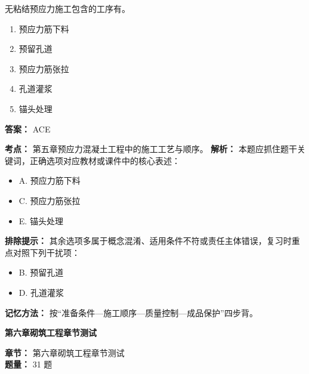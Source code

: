 \documentclass[UTF8,fontset=fandol,11pt]{ctexart}
\newcommand{\chaptertitle}[1]{\vspace{0.5em}\begin{tcolorbox}[enhanced,colback=deepblue,colframe=deepblue,arc=2mm,boxrule=0pt]\begin{center}\Large\bfseries\color{white}#1\end{center}\end{tcolorbox}\vspace{0.5em}}
\begin{document}
\begin{quizbox}[title={第 7 题}]
无粘结预应力施工包含的工序有。\\
\begin{enumerate}[label=\Alph*.]
\item 预应力筋下料
\item 预留孔道
\item 预应力筋张拉
\item 孔道灌浆
\item 锚头处理
\end{enumerate}
\textbf{答案：} ACE
\vspace{0.25em}
\begin{answerbox}[title={考点解析}]
\textbf{考点：} 第五章预应力混凝土工程中的施工工艺与顺序。
\textbf{解析：} 本题应抓住题干关键词，正确选项对应教材或课件中的核心表述：
\begin{itemize}
\item A. 预应力筋下料
\item C. 预应力筋张拉
\item E. 锚头处理
\end{itemize}
\textbf{排除提示：} 其余选项多属于概念混淆、适用条件不符或责任主体错误，复习时重点对照下列干扰项：
\begin{itemize}
\item B. 预留孔道
\item D. 孔道灌浆
\end{itemize}
\textbf{记忆方法：} 按“准备条件—施工顺序—质量控制—成品保护”四步背。
\end{answerbox}
\end{quizbox}

\chaptertitle{第六章砌筑工程章节测试}
\begin{mainbox}
\textbf{\textcolor{mainblue}{章节：}} 第六章砌筑工程章节测试\\
\textbf{\textcolor{answerred}{题量：}} 31 题
\end{mainbox}
\end{document}
